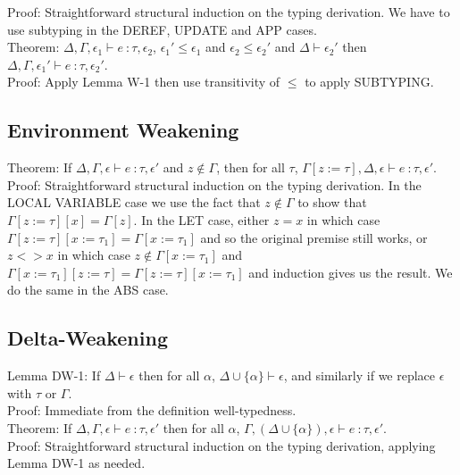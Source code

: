 \documentclass{article}
\begin{document}
\noindent Proof: Straightforward structural induction on the typing derivation. We have to use subtyping in the DEREF, UPDATE and APP cases.
\\

\noindent Theorem: $\Delta, \Gamma, \epsilon_1 \vdash e\ \colon \tau, \epsilon_2$, $\epsilon_1' \leq \epsilon_1$ and $\epsilon_2 \leq \epsilon_2'$ and $\Delta \vdash \epsilon_2'$ then $\Delta, \Gamma, \epsilon_1' \vdash e\ \colon \tau, \epsilon_2'$.
\\

\noindent Proof: Apply Lemma W-1 then use transitivity of $\leq$ to apply SUBTYPING.

\subsection*{Environment Weakening}
Theorem: If $\Delta, \Gamma, \epsilon \vdash e\ \colon \tau, \epsilon'$ and $z \notin \Gamma$, then for all $\tau$, $\Gamma[z := \tau], \Delta, \epsilon \vdash e\ \colon \tau, \epsilon'$.
\\

\noindent Proof: Straightforward structural induction on the typing derivation. In the LOCAL VARIABLE case we use the fact that $z \notin \Gamma$ to show that $\Gamma[z := \tau][x] = \Gamma[z]$. In the LET case, either $z = x$ in which case $\Gamma[z := \tau][x := \tau_1] = \Gamma[x := \tau_1]$ and so the original premise still works, or $z <> x$ in which case $z \notin \Gamma[x := \tau_1]$ and $\Gamma[x := \tau_1][z := \tau] = \Gamma[z := \tau][x := \tau_1]$ and induction gives us the result. We do the same in the ABS case.

\subsection*{Delta-Weakening}
\noindent Lemma DW-1: If $\Delta \vdash \epsilon$ then for all $\alpha$, $\Delta \cup \{\alpha\} \vdash \epsilon$, and similarly if we replace $\epsilon$ with $\tau$ or $\Gamma$.
\\

\noindent Proof: Immediate from the definition well-typedness.
\\

\noindent Theorem: If $\Delta, \Gamma, \epsilon \vdash e\ \colon \tau, \epsilon'$ then for all $\alpha$, $\Gamma, (\Delta \cup \{\alpha\}), \epsilon \vdash e\ \colon \tau, \epsilon'$.
\\

\noindent Proof: Straightforward structural induction on the typing derivation, applying Lemma DW-1 as needed.
\end{document}
